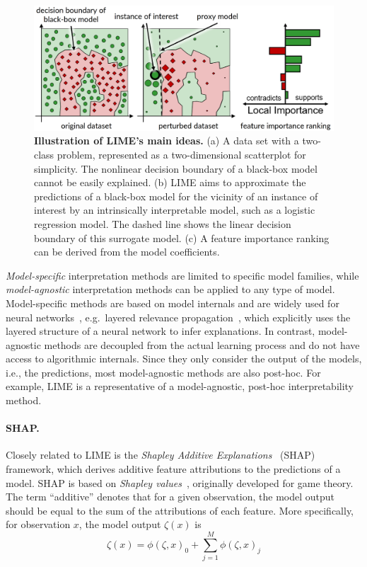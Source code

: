 \documentclass[
  oneside]{book}
\begin{document}
\begin{figure}[h]

{\centering \includegraphics[width=1\linewidth]{figures/09-lime} 

}

\caption{\textbf{Illustration of LIME's main ideas.} (a) A data set with a two-class problem, represented as a two-dimensional scatterplot for simplicity. The nonlinear decision boundary of a black-box model cannot be easily explained. (b) LIME aims to approximate the predictions of a black-box model for the vicinity of an instance of interest by an intrinsically interpretable model, such as a logistic regression model. The dashed line shows the linear decision boundary of this surrogate model. (c) A feature importance ranking can be derived from the model coefficients.}\label{fig:09-lime}
\end{figure}

\emph{Model-specific} interpretation methods are limited to specific model families, while \emph{model-agnostic} interpretation methods can be applied to any type of model.
Model-specific methods are based on model internals and are widely used for neural networks~\autocite{samek2020toward}, e.g.~layered relevance propagation~\autocite{bach2015pixel}, which explicitly uses the layered structure of a neural network to infer explanations.
In contrast, model-agnostic methods are decoupled from the actual learning process and do not have access to algorithmic internals.
Since they only consider the output of the models, i.e., the predictions, most model-agnostic methods are also post-hoc.
For example, LIME is a representative of a model-agnostic, post-hoc interpretability method.

\paragraph*{SHAP.}

Closely related to LIME is the \emph{Shapley Additive Explanations}~\autocite{Lundberg:SHAP2017} (SHAP) framework, which derives additive feature attributions to the predictions of a model.
SHAP is based on \emph{Shapley values}~\autocite{lipovetsky2001analysis,vstrumbelj2014explaining,shapley1953value}, originally developed for game theory.
The term ``additive'' denotes that for a given observation, the model output should be equal to the sum of the attributions of each feature.
More specifically, for observation \(x\), the model output \(\zeta(x)\) is
\begin{equation}
\zeta(x)=\phi(\zeta,x)_0 + \sum_{j=1}^M \phi(\zeta,x)_j
\label{eq:shap-additivity}
\end{equation}
\end{document}
